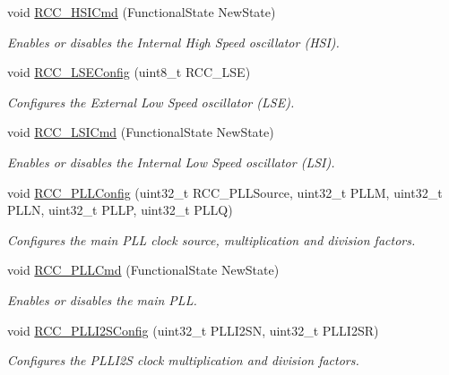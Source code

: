 \begin{DoxyCompactItemize}
void \hyperlink{group___r_c_c___group1_ga0c6772a1e43765909495f57815ef69e2}{R\+C\+C\+\_\+\+H\+S\+I\+Cmd} (Functional\+State New\+State)
\begin{DoxyCompactList}\small\item\em Enables or disables the Internal High Speed oscillator (H\+SI). \end{DoxyCompactList}\item 
void \hyperlink{group___r_c_c___group1_ga65209ab5c3589b249c7d70f978735ca6}{R\+C\+C\+\_\+\+L\+S\+E\+Config} (uint8\+\_\+t R\+C\+C\+\_\+\+L\+SE)
\begin{DoxyCompactList}\small\item\em Configures the External Low Speed oscillator (L\+SE). \end{DoxyCompactList}\item 
void \hyperlink{group___r_c_c___group1_ga81e3ca29fd154ac2019bba6936d6d5ed}{R\+C\+C\+\_\+\+L\+S\+I\+Cmd} (Functional\+State New\+State)
\begin{DoxyCompactList}\small\item\em Enables or disables the Internal Low Speed oscillator (L\+SI). \end{DoxyCompactList}\item 
void \hyperlink{group___r_c_c___group1_ga154b93e90bfdede2a874244a1ff1002e}{R\+C\+C\+\_\+\+P\+L\+L\+Config} (uint32\+\_\+t R\+C\+C\+\_\+\+P\+L\+L\+Source, uint32\+\_\+t P\+L\+LM, uint32\+\_\+t P\+L\+LN, uint32\+\_\+t P\+L\+LP, uint32\+\_\+t P\+L\+LQ)
\begin{DoxyCompactList}\small\item\em Configures the main P\+LL clock source, multiplication and division factors. \end{DoxyCompactList}\item 
void \hyperlink{group___r_c_c___group1_ga84dee53c75e58fdb53571716593c2272}{R\+C\+C\+\_\+\+P\+L\+L\+Cmd} (Functional\+State New\+State)
\begin{DoxyCompactList}\small\item\em Enables or disables the main P\+LL. \end{DoxyCompactList}\item 
void \hyperlink{group___r_c_c___group1_ga4c15157382939a693c15620a4867e6ad}{R\+C\+C\+\_\+\+P\+L\+L\+I2\+S\+Config} (uint32\+\_\+t P\+L\+L\+I2\+SN, uint32\+\_\+t P\+L\+L\+I2\+SR)
\begin{DoxyCompactList}\small\item\em Configures the P\+L\+L\+I2S clock multiplication and division factors. \end{DoxyCompactList}\item 

\end{DoxyCompactItemize}
